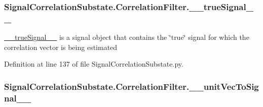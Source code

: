 \subsubsection[{\texorpdfstring{\+\_\+\+\_\+true\+Signal\+\_\+\+\_\+}{__trueSignal__}}]{\setlength{\rightskip}{0pt plus 5cm}Signal\+Correlation\+Substate.\+Correlation\+Filter.\+\_\+\+\_\+true\+Signal\+\_\+\+\_\+\hspace{0.3cm}{\ttfamily [private]}}\hypertarget{classSignalCorrelationSubstate_1_1CorrelationFilter_a5f777d3a877658a1365ebac65b9ab25b}{}\label{classSignalCorrelationSubstate_1_1CorrelationFilter_a5f777d3a877658a1365ebac65b9ab25b}


\hyperlink{classSignalCorrelationSubstate_1_1CorrelationFilter_a5f777d3a877658a1365ebac65b9ab25b}{\+\_\+\+\_\+true\+Signal\+\_\+\+\_\+} is a signal object that contains the \char`\"{}true\char`\"{} signal for which the correlation vector is being estimated 



Definition at line 137 of file Signal\+Correlation\+Substate.\+py.

\subsubsection[{\texorpdfstring{\+\_\+\+\_\+unit\+Vec\+To\+Signal\+\_\+\+\_\+}{__unitVecToSignal__}}]{\setlength{\rightskip}{0pt plus 5cm}Signal\+Correlation\+Substate.\+Correlation\+Filter.\+\_\+\+\_\+unit\+Vec\+To\+Signal\+\_\+\+\_\+\hspace{0.3cm}{\ttfamily [private]}}\hypertarget{classSignalCorrelationSubstate_1_1CorrelationFilter_a18f7cac4d1943bc7f780db22f0355e4a}{}\label{classSignalCorrelationSubstate_1_1CorrelationFilter_a18f7cac4d1943bc7f780db22f0355e4a}


